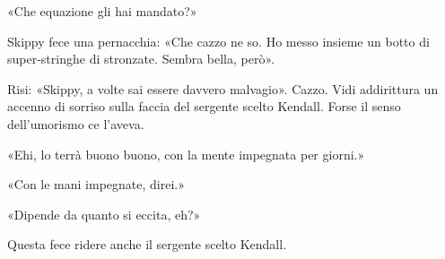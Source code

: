 «Che equazione gli hai mandato?»

Skippy fece una pernacchia: «Che cazzo ne so. Ho messo insieme un botto
di super-stringhe di stronzate. Sembra bella, però».

Risi: «Skippy, a volte sai essere davvero malvagio». Cazzo. Vidi
addirittura un accenno di sorriso sulla faccia del sergente scelto
Kendall. Forse il senso dell'umorismo ce l'aveva.

«Ehi, lo terrà buono buono, con la mente impegnata per giorni.»

«Con le mani impegnate, direi.»

«Dipende da quanto si eccita, eh?»

Questa fece ridere anche il sergente scelto Kendall.